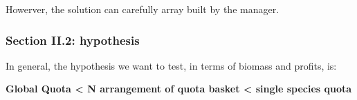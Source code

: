 \documentclass[
]{article}
\begin{document}
Howerver, the solution can carefully array built by the manager.

\hypertarget{section-ii.2-hypothesis}{%
\subsubsection{Section II.2: hypothesis}\label{section-ii.2-hypothesis}}

In general, the hypothesis we want to test, in terms of biomass and
profits, is:

\textbf{Global Quota \textless{} N arrangement of quota basket
\textless{} single species quota}
\end{document}
